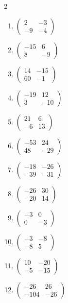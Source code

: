 \begin{multicols}{2}
\begin{enumerate}[label=\arabic*., leftmargin=*, itemsep=1pt]
\item $\left(\begin{smallmatrix}2 & -3\\ -9 & -4\end{smallmatrix}\right)$
\item $\left(\begin{smallmatrix}-15 & 6\\ 8 & -9\end{smallmatrix}\right)$
\item $\left(\begin{smallmatrix}14 & -15\\ 60 & -1\end{smallmatrix}\right)$
\item $\left(\begin{smallmatrix}-19 & 12\\ 3 & -10\end{smallmatrix}\right)$
\item $\left(\begin{smallmatrix}21 & 6\\ -6 & 13\end{smallmatrix}\right)$
\item $\left(\begin{smallmatrix}-53 & 24\\ 48 & -29\end{smallmatrix}\right)$
\item $\left(\begin{smallmatrix}-18 & -26\\ -39 & -31\end{smallmatrix}\right)$
\item $\left(\begin{smallmatrix}-26 & 30\\ -20 & 14\end{smallmatrix}\right)$
\item $\left(\begin{smallmatrix}-3 & 0\\ 0 & -3\end{smallmatrix}\right)$
\item $\left(\begin{smallmatrix}-3 & -8\\ -8 & 5\end{smallmatrix}\right)$
\item $\left(\begin{smallmatrix}10 & -20\\ -5 & -15\end{smallmatrix}\right)$
\item $\left(\begin{smallmatrix}-26 & 26\\ -104 & -26\end{smallmatrix}\right)$

\end{enumerate}
\end{multicols}
